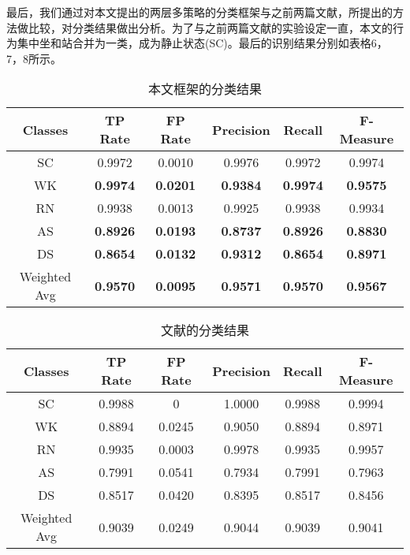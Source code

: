 \par 最后，我们通过对本文提出的两层多策略的分类框架与之前两篇文献\cite{orientationTransation1}，\cite{bisio2014comparison}所提出的方法做比较，对分类结果做出分析。为了与之前两篇文献的实验设定一直，本文的行为集中坐和站合并为一类，成为静止状态(SC)。最后的识别结果分别如表格6，7，8所示。
 \begin{table}[htb]
    \centering
    \caption{本文框架的分类结果}
    \begin{tabular}{cccccc}
    \toprule
    Classes & TP Rate & FP Rate & Precision & Recall & F-Measure \\
    \midrule
    SC & 0.9972 & 0.0010 & 0.9976 & 0.9972 & 0.9974 \\
    WK & \textbf{0.9974} & \textbf{0.0201} & \textbf{0.9384} & \textbf{0.9974} & \textbf{0.9575}	\\
    RN & 0.9938 & 0.0013 & 0.9925 & 0.9938 & 0.9934	\\
    AS & \textbf{0.8926} & \textbf{0.0193} & \textbf{0.8737} & \textbf{0.8926} & \textbf{0.8830} \\
    DS & \textbf{0.8654} & \textbf{0.0132} & \textbf{0.9312} & \textbf{0.8654} & \textbf{0.8971}	\\
    \hline
    Weighted Avg & \textbf{0.9570} & \textbf{0.0095} & \textbf{0.9571} & \textbf{0.9570} & \textbf{0.9567} \\
    \bottomrule
    \end{tabular}
 \end{table}

 \begin{table}[htb]
    \centering
    \caption{文献的分类结果}
    \begin{tabular}{cccccc}
    \toprule
    Classes & TP Rate & FP Rate & Precision & Recall & F-Measure \\
    \midrule
    SC & 0.9988 & 0 & 1.0000 & 0.9988 & 0.9994 \\
    WK & 0.8894 & 0.0245 & 0.9050 & 0.8894 & 0.8971	\\
    RN & 0.9935 & 0.0003 & 0.9978 & 0.9935 & 0.9957	\\
    AS & 0.7991 & 0.0541 & 0.7934 & 0.7991 & 0.7963 \\
    DS & 0.8517 & 0.0420 & 0.8395 & 0.8517 & 0.8456	\\
    \hline
    Weighted Avg & 0.9039 & 0.0249 & 0.9044 & 0.9039 & 0.9041 \\
    \bottomrule
    \end{tabular}
 \end{table}

